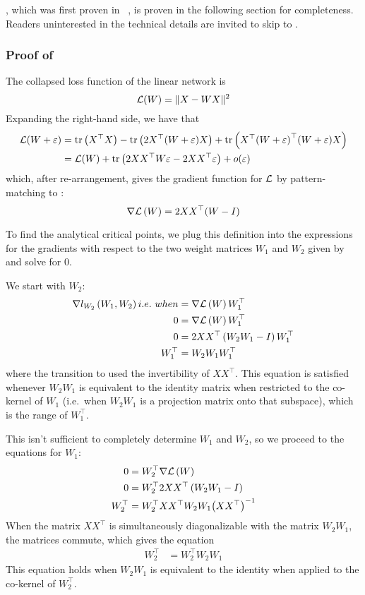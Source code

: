 \documentclass[../../thesis.tex]{subfiles}
\begin{document}
,
which was first proven in%
~\cite{baldi1989},
is proven in the following section
for completeness.
Readers uninterested in the technical details
are invited to skip to
.

\subsubsection{Proof of }%

The collapsed loss function of the linear network is
\begin{equation}
	{\mathcal{L}}(W) = \lVert X - WX\rVert^2
\end{equation}
\noindent Expanding the right-hand side,
we have that
\begin{align}
	{\mathcal{L}}(W + \varepsilon)
	&= \mathrm{tr}\left(X^\top X\right) - \mathrm{tr}\left(2X^\top(W+\varepsilon)X\right)
	+ \mathrm{tr}\left(X^\top{(W+\varepsilon)}^\top(W+\varepsilon)X\right)\\
	&= {\mathcal{L}}(W) + \mathrm{tr}\left(2 XX^\top W \varepsilon - 2XX^\top\varepsilon\right) + o(\varepsilon)
\end{align}
\noindent which, after re-arrangement, gives the gradient function
for ${\mathcal{L}}$ by pattern-matching to :
\begin{equation}
	\nabla{\mathcal{L}}\left(W\right) = 2 XX^\top (W - I)
\end{equation}

To find the analytical critical points,
we plug this definition into
the expressions for the gradients with respect to
the two weight matrices $W_1$ and $W_2$
given by 
and solve for 0.

We start with $W_2$:
\begin{align}
	\grad{l_{W_2}}{W_1, W_2} i.e.~when &= \grad{\cL}{W} W_1^\top\\
	0 &= \grad{\cL}{W} W_1^\top\\
	0 &= 2 XX^\top\left(W_2 W_1 - I\right) W_1^\top\\
	W_1^\top &= W_2W_1 W_1^\top\equationlabel{last-line-W2-grad}
\end{align}
\noindent where the transition to 
used the invertibility of $XX^\top$.
This equation is satisfied
whenever $W_2 W_1$ is equivalent to the identity
matrix when restricted to the co-kernel of $W_1$
(i.e.~when $W_2W_1$ is a projection matrix onto that subspace),
which is the range of $W_1^\top$.

This isn't sufficient to completely determine
$W_1$ and $W_2$,
so we proceed to the equations
for $W_1$:
\begin{align}
	0 &= W_2^\top\nabla{\mathcal{L}}\left(W\right)\\
	0 &= W_2^\top 2 XX^\top\left(W_2 W_1 - I\right)\\
	W_2^\top &= W_2^\top XX^\top W_2 W_1 {\left(X X^\top\right)}^{-1}
\end{align}
\noindent When the matrix $XX^\top$
is simultaneously diagonalizable with the matrix $W_2W_1$,
the matrices commute,
which gives the equation
\begin{align}
	W_2^\top &= W_2^\top W_2 W_1
\end{align}
\noindent
This equation holds when $W_2 W_1$ is equivalent to the identity
when applied to the co-kernel of $W_2^\top$.
\end{document}
